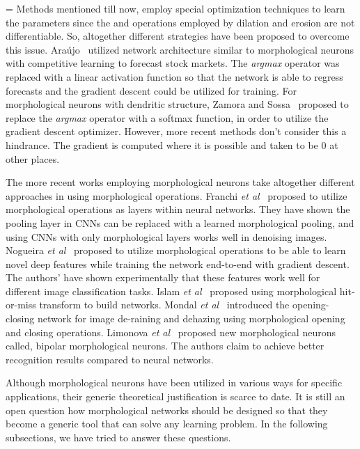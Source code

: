 \documentclass{bmvc2k}
\def\etal{\emph{et al}\bmvaOneDot}
\begin{document}
=
Methods mentioned till now, employ special optimization techniques to learn the parameters since the  and  operations employed by dilation and erosion are not differentiable. So, altogether different strategies have been proposed to overcome this issue. 
Ara\'{u}jo~\cite{de_a._araujo_morphological_2012} utilized network architecture similar to morphological neurons with competitive learning to forecast stock markets. The \emph{argmax} operator was replaced with a linear activation function so that the network is able to regress forecasts and the gradient descent could be utilized for training. 
For morphological neurons with dendritic structure, Zamora and Sossa~\cite{zamora_dendrite_2017} proposed to replace the \emph{argmax} operator with a softmax function, in order to utilize the gradient descent optimizer. However, more recent methods don't consider this a hindrance. The gradient is computed where it is possible and taken to be 0 at other places.


The more recent works employing morphological neurons take altogether different approaches in using morphological operations.
Franchi \etal{}~\cite{franchi2020deep} proposed to utilize morphological operations as layers within neural networks. They have shown the pooling layer in CNNs can be replaced with a learned morphological pooling, and using CNNs with only morphological layers works well in denoising images. 
Nogueira \etal{}~\cite{nogueira2019introduction} proposed to utilize morphological operations to be able to learn novel deep features while training the network end-to-end with gradient descent. The authors' have shown experimentally that these features work well for different image classification tasks. 
Islam \etal{}~\cite{aminul2019deep} proposed using morphological hit-or-miss transform to build networks. Mondal \etal{}~\cite{mondal2020image} introduced the opening-closing network for image de-raining and dehazing using morphological opening and closing operations. Limonova \etal{}~\cite{limonova2020bipolar} proposed new morphological neurons called, bipolar morphological neurons. The authors claim to achieve better recognition results compared to neural networks. 

Although morphological neurons have been utilized in various ways for specific applications, their generic theoretical justification is scarce to date. It is still an open question how morphological networks should be designed so that they become a generic tool that can solve any learning problem.
In the following subsections, we have tried to answer these questions. 
\end{document}
